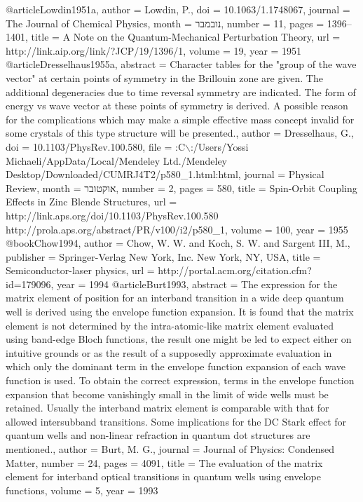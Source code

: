 @article{Lowdin1951a,
author = {Lowdin, P.},
doi = {10.1063/1.1748067},
journal = {The Journal of Chemical Physics},
month = {נובמבר},
number = {11},
pages = {1396--1401},
title = {{A Note on the Quantum-Mechanical Perturbation Theory}},
url = {http://link.aip.org/link/?JCP/19/1396/1},
volume = {19},
year = {1951}
}
@article{Dresselhaus1955a,
abstract = {Character tables for the "group of the wave vector" at certain points of symmetry in the Brillouin zone are given. The additional degeneracies due to time reversal symmetry are indicated. The form of energy vs wave vector at these points of symmetry is derived. A possible reason for the complications which may make a simple effective mass concept invalid for some crystals of this type structure will be presented.},
author = {Dresselhaus, G.},
doi = {10.1103/PhysRev.100.580},
file = {:C$\backslash$:/Users/Yossi Michaeli/AppData/Local/Mendeley Ltd./Mendeley Desktop/Downloaded/CUMRJ4T2/p580\_1.html:html},
journal = {Physical Review},
month = {אוקטובר},
number = {2},
pages = {580},
title = {{Spin-Orbit Coupling Effects in Zinc Blende Structures}},
url = {http://link.aps.org/doi/10.1103/PhysRev.100.580 http://prola.aps.org/abstract/PR/v100/i2/p580\_1},
volume = {100},
year = {1955}
}
@book{Chow1994,
author = {Chow, W. W. and Koch, S. W. and {Sargent III}, M.},
publisher = {Springer-Verlag New York, Inc. New York, NY, USA},
title = {{Semiconductor-laser physics}},
url = {http://portal.acm.org/citation.cfm?id=179096},
year = {1994}
}
@article{Burt1993,
abstract = {The expression for the matrix element of position for an interband transition in a wide deep quantum well is derived using the envelope function expansion. It is found that the matrix element is not determined by the intra-atomic-like matrix element evaluated using band-edge Bloch functions, the result one might be led to expect either on intuitive grounds or as the result of a supposedly approximate evaluation in which only the dominant term in the envelope function expansion of each wave function is used. To obtain the correct expression, terms in the envelope function expansion that become vanishingly small in the limit of wide wells must be retained. Usually the interband matrix element is comparable with that for allowed intersubband transitions. Some implications for the DC Stark effect for quantum wells and non-linear refraction in quantum dot structures are mentioned.},
author = {Burt, M. G.},
journal = {Journal of Physics: Condensed Matter},
number = {24},
pages = {4091},
title = {{The evaluation of the matrix element for interband optical transitions in quantum wells using envelope functions}},
volume = {5},
year = {1993}
}
